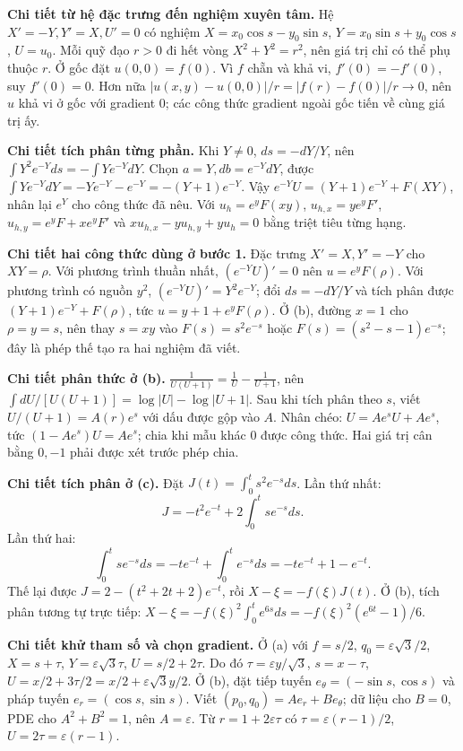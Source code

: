 \textbf{Chi tiết từ hệ đặc trưng đến nghiệm xuyên tâm.} Hệ $X'=-Y,Y'=X,U'=0$ có nghiệm $X=x_0\cos s-y_0\sin s$, $Y=x_0\sin s+y_0\cos s$, $U=u_0$. Mỗi quỹ đạo $r>0$ đi hết vòng $X^2+Y^2=r^2$, nên giá trị chỉ có thể phụ thuộc $r$. Ở gốc đặt $u(0,0)=f(0)$. Vì $f$ chẵn và khả vi, $f'(0)=-f'(0)$, suy $f'(0)=0$. Hơn nữa $|u(x,y)-u(0,0)|/r=|f(r)-f(0)|/r\to0$, nên $u$ khả vi ở gốc với gradient $0$; các công thức gradient ngoài gốc tiến về cùng giá trị ấy.

\textbf{Chi tiết tích phân từng phần.} Khi $Y\ne0$, $ds=-dY/Y$, nên $\int Y^2e^{-Y}ds=-\int Ye^{-Y}dY$. Chọn $a=Y,db=e^{-Y}dY$, được $\int Ye^{-Y}dY=-Ye^{-Y}-e^{-Y}=-(Y+1)e^{-Y}$. Vậy $e^{-Y}U=(Y+1)e^{-Y}+F(XY)$, nhân lại $e^Y$ cho công thức đã nêu. Với $u_h=e^yF(xy)$, $u_{h,x}=ye^yF'$, $u_{h,y}=e^yF+xe^yF'$ và $xu_{h,x}-yu_{h,y}+yu_h=0$ bằng triệt tiêu từng hạng.

\textbf{Chi tiết hai công thức dùng ở bước 1.} Đặc trưng $X'=X,Y'=-Y$ cho $XY=\rho$. Với phương trình thuần nhất, $(e^{-Y}U)'=0$ nên $u=e^yF(\rho)$. Với phương trình có nguồn $y^2$, $(e^{-Y}U)'=Y^2e^{-Y}$; đổi $ds=-dY/Y$ và tích phân được $(Y+1)e^{-Y}+F(\rho)$, tức $u=y+1+e^yF(\rho)$. Ở (b), đường $x=1$ cho $\rho=y=s$, nên thay $s=xy$ vào $F(s)=s^2e^{-s}$ hoặc $F(s)=(s^2-s-1)e^{-s}$; đây là phép thế tạo ra hai nghiệm đã viết.

\textbf{Chi tiết phân thức ở (b).} $\frac1{U(U+1)}=\frac1U-\frac1{U+1}$, nên $\int dU/[U(U+1)]=\log|U|-\log|U+1|$. Sau khi tích phân theo $s$, viết $U/(U+1)=A(r)e^s$ với dấu được gộp vào $A$. Nhân chéo: $U=Ae^sU+Ae^s$, tức $(1-Ae^s)U=Ae^s$; chia khi mẫu khác $0$ được công thức. Hai giá trị cân bằng $0,-1$ phải được xét trước phép chia.

\textbf{Chi tiết tích phân ở (c).} Đặt $J(t)=\int_0^t s^2e^{-s}ds$. Lần thứ nhất:
\[J=-t^2e^{-t}+2\int_0^t se^{-s}ds.\]
Lần thứ hai:
\[\int_0^t se^{-s}ds=-te^{-t}+\int_0^t e^{-s}ds=-te^{-t}+1-e^{-t}.\]
Thế lại được $J=2-(t^2+2t+2)e^{-t}$, rồi $X-\xi=-f(\xi)J(t)$. Ở (b), tích phân tương tự trực tiếp: $X-\xi=-f(\xi)^2\int_0^te^{6s}ds=-f(\xi)^2(e^{6t}-1)/6$.

\textbf{Chi tiết khử tham số và chọn gradient.} Ở (a) với $f=s/2$, $q_0=\varepsilon\sqrt3/2$, $X=s+\tau$, $Y=\varepsilon\sqrt3\tau$, $U=s/2+2\tau$. Do đó $\tau=\varepsilon y/\sqrt3$, $s=x-\tau$, $U=x/2+3\tau/2=x/2+\varepsilon\sqrt3 y/2$. Ở (b), đặt tiếp tuyến $e_\theta=(-\sin s,\cos s)$ và pháp tuyến $e_r=(\cos s,\sin s)$. Viết $(p_0,q_0)=Ae_r+Be_\theta$; dữ liệu cho $B=0$, PDE cho $A^2+B^2=1$, nên $A=\varepsilon$. Từ $r=1+2\varepsilon\tau$ có $\tau=\varepsilon(r-1)/2$, $U=2\tau=\varepsilon(r-1)$.

